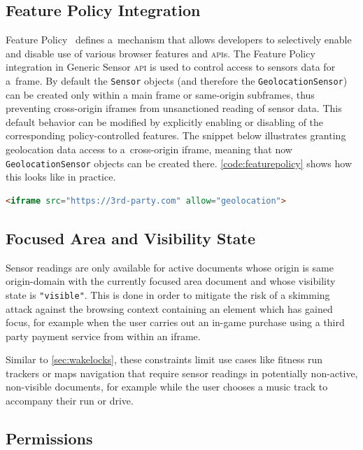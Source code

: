 \documentclass[sigconf,hyphens]{acmart}
\begin{document}
\subsection{Feature Policy Integration}

Feature Policy~\cite{clelland2019featurepolicy} defines a~mechanism that allows developers
to selectively enable and disable use of various browser features and \textsc{api}s.
The Feature Policy integration in Generic Sensor \textsc{api}
is used to control access to sensors data for a~frame.
By default the \texttt{Sensor} objects (and therefore the \texttt{GeolocationSensor})
can be created only within a main frame or same-origin subframes,
thus preventing cross-origin iframes from unsanctioned reading of sensor data.
This default behavior can be modified by explicitly enabling or disabling
of the corresponding policy-controlled features.
The snippet below illustrates granting geolocation data access to a~cross-origin iframe,
meaning that now \texttt{GeolocationSensor} objects can be created there.
\autoref{code:featurepolicy} shows how this looks like in practice.

\begin{lstlisting}[caption={Allowing an iframe to use \texttt{GeolocationSensor}},
  label=code:featurepolicy, language=HTML, float=h] 
<iframe src="https://3rd-party.com" allow="geolocation">
\end{lstlisting}

\subsection{Focused Area and Visibility State}
\label{sec:focusandvisibility}

Sensor readings are only available for active documents whose origin is same origin-domain
with the currently focused area document and whose visibility state is \texttt{"visible"}.
This is done in order to mitigate the risk of a skimming attack
against the browsing context containing an element which has gained focus,
for example when the user carries out an in-game purchase using a third party payment service
from within an iframe.

Similar to \autoref{sec:wakelocks}, these constraints limit use cases like fitness run trackers
or maps navigation that require sensor readings in potentially non-active, non-visible documents,
for example while the user chooses a music track to accompany their run or drive.

\subsection{Permissions}
\end{document}
